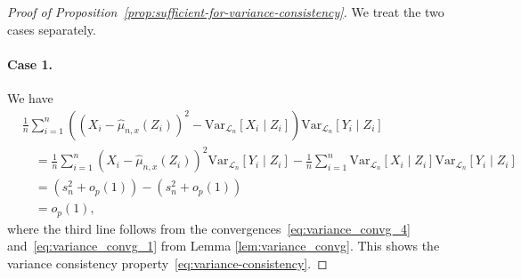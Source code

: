 \documentclass[aos]{imsart}
\theoremstyle{plain}
\theoremstyle{remark}
\newcommand{\V}{\mathrm{Var}}							%
\newcommand{\srx}{X}									%
\newcommand{\srz}{Z}									%
\newcommand{\sry}{Y}									%
\newcommand{\law}{\mathcal L}							%
\begin{document}
\begin{proof}[Proof of Proposition~\ref{prop:sufficient-for-variance-consistency}]

We treat the two cases separately.

\paragraph*{Case 1.}
We have
\begin{align*}
&\frac{1}{n} \sum_{i = 1}^n ((\srx_i - \widehat \mu_{n,x}(\srz_i))^2 - \V_{\law_n}[\srx_i \mid \srz_i])\V_{\law_n}[\sry_i\mid\srz_i] \\
&\quad= \frac{1}{n} \sum_{i = 1}^n (\srx_i - \widehat \mu_{n,x}(\srz_i))^2\V_{\law_n}[\sry_i\mid\srz_i] - \frac{1}{n} \sum_{i = 1}^n \V_{\law_n}[\srx_i \mid \srz_i]\V_{\law_n}[\sry_i\mid\srz_i] \\
&\quad= (s^2_n + o_p(1)) - (s^2_n + o_p(1)) \\
&\quad= o_p(1),
\end{align*}
where the third line follows from the convergences~\eqref{eq:variance_convg_4} and~\eqref{eq:variance_convg_1} from Lemma \ref{lem:variance_convg}. This shows the variance consistency property~\eqref{eq:variance-consistency}.


\end{proof}
\end{document}
